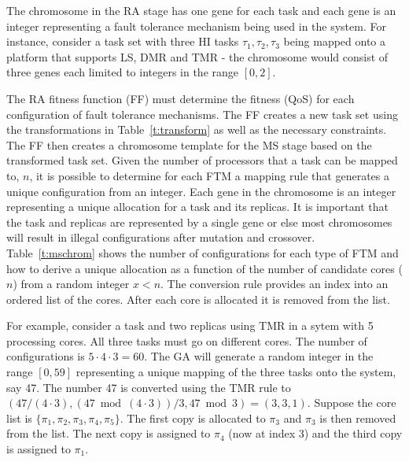 	
	The chromosome in the RA stage has one gene for each task and each gene is an integer representing a fault tolerance mechanism being used in the system. 
	For instance, consider a task set with three HI tasks ${\tau_1,\tau_2,\tau_3}$ being mapped onto a platform that supports LS, DMR and TMR - the chromosome would consist of three genes each limited to integers in the range $[0,2]$. 
	
	The RA fitness function (FF) must determine the fitness (QoS) for each configuration of fault tolerance mechanisms. 
	The FF creates a new task set using the transformations in Table~\ref{t:transform} as well as the necessary constraints. 
	The FF then creates a chromosome template for the MS stage based on the transformed task set. 
	Given the number of processors that a task can be mapped to, $n$, it is possible to determine for each FTM a mapping rule that generates a unique configuration from an integer. 
	Each gene in the chromosome is an integer representing a unique allocation for a task and its replicas. 
	It is important that the task and replicas are represented by a single gene or else most chromosomes will result in illegal configurations after mutation and crossover. 
	Table~\ref{t:mschrom} shows the number of configurations for each type of FTM and how to derive a unique allocation as a function of the number of candidate cores ($n$) from a random integer $x < n$. 
	The conversion rule provides an index into an ordered list of the cores. After each core is allocated it is removed from the list.
	
	For example, consider a task and two replicas using TMR in a sytem with 5 processing cores. 
	All three tasks must go on different cores. 
	The number of configurations is $5 \cdot 4 \cdot 3 = 60$. 
	The GA will generate a random integer in the range $[0,59]$ representing a unique mapping of the three tasks onto the system, say 47. 
	The number 47 is converted using the TMR rule to $(47/(4\cdot3),(47\bmod(4\cdot3))/3,47\bmod3) = (3,3,1)$. 
	Suppose the core list is $\{\pi_1,\pi_2,\pi_3,\pi_4,\pi_5\}$. 
	The first copy is allocated to $\pi_3$ and $\pi_3$ is then removed from the list. 
	The next copy is assigned to $\pi_4$ (now at index 3) and the third copy is assigned to $\pi_1$. 
	
